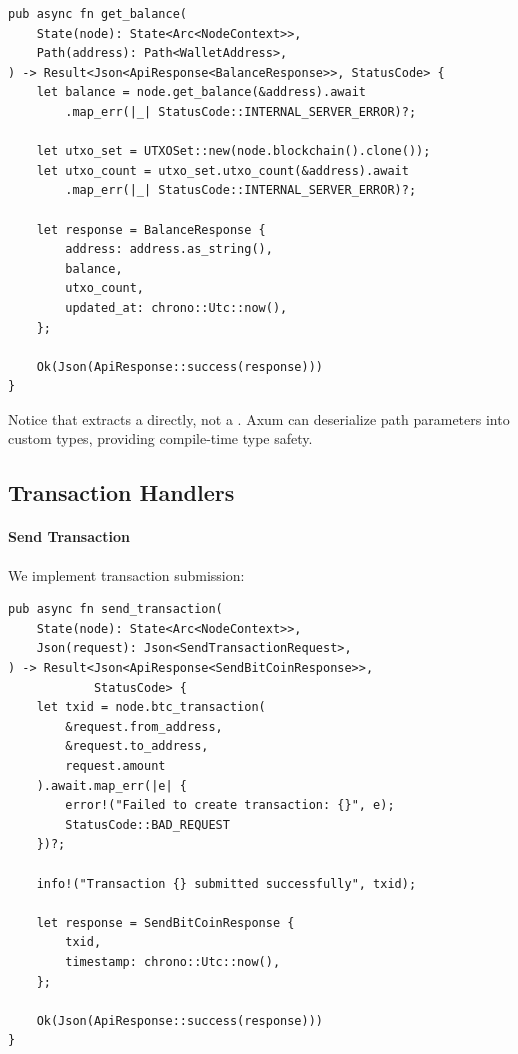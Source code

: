 \begin{listing}[htbp]
\caption{Get balance handler with typed path parameter}
\label{lst:handler-balance}
\begin{verbatim}
pub async fn get_balance(
    State(node): State<Arc<NodeContext>>,
    Path(address): Path<WalletAddress>,
) -> Result<Json<ApiResponse<BalanceResponse>>, StatusCode> {
    let balance = node.get_balance(&address).await
        .map_err(|_| StatusCode::INTERNAL_SERVER_ERROR)?;

    let utxo_set = UTXOSet::new(node.blockchain().clone());
    let utxo_count = utxo_set.utxo_count(&address).await
        .map_err(|_| StatusCode::INTERNAL_SERVER_ERROR)?;

    let response = BalanceResponse {
        address: address.as_string(),
        balance,
        utxo_count,
        updated_at: chrono::Utc::now(),
    };

    Ok(Json(ApiResponse::success(response)))
}
\end{verbatim}
\end{listing}

Notice that  extracts a  directly, not a . Axum can deserialize path parameters into custom types, providing compile-time type safety.

\subsection{Transaction Handlers}

\paragraph{Send Transaction}

We implement transaction submission:

\begin{listing}[htbp]
\caption{Send transaction handler with error mapping}
\label{lst:handler-send-tx}
\begin{verbatim}
pub async fn send_transaction(
    State(node): State<Arc<NodeContext>>,
    Json(request): Json<SendTransactionRequest>,
) -> Result<Json<ApiResponse<SendBitCoinResponse>>,
            StatusCode> {
    let txid = node.btc_transaction(
        &request.from_address,
        &request.to_address,
        request.amount
    ).await.map_err(|e| {
        error!("Failed to create transaction: {}", e);
        StatusCode::BAD_REQUEST
    })?;

    info!("Transaction {} submitted successfully", txid);

    let response = SendBitCoinResponse {
        txid,
        timestamp: chrono::Utc::now(),
    };

    Ok(Json(ApiResponse::success(response)))
}
\end{verbatim}
\end{listing}

